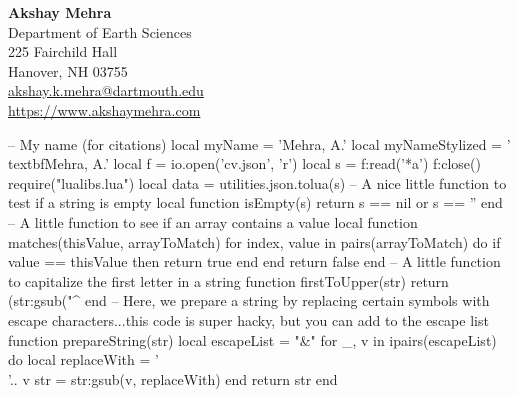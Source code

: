 \documentclass[letterpaper, 10pt]{article}
\begin{document}
\thispagestyle{empty}

\begin{center}
	{\Large \textbf{Akshay Mehra}}\\
	Department of Earth Sciences \\
	225 Fairchild Hall \\
	Hanover, NH 03755 \\
	\href{mailto:akshay.k.mehra@dartmouth.edu}{akshay.k.mehra@dartmouth.edu} \\
	\href{https://www.akshaymehra.com}{https://www.akshaymehra.com}\\
\end{center}
	

\begin{luacode}
	-- My name (for citations)
	local myName = 'Mehra, A.'
	local myNameStylized = '\\textbf{Mehra, A.}'
	local f = io.open('cv.json', 'r')
	local s = f:read('*a')
	f:close()
	require("lualibs.lua")
	local data = utilities.json.tolua(s)
	-- A nice little function to test if a string is empty
	local function isEmpty(s)
		return s == nil or s == ''
	end
	-- A little function to see if an array contains a value
	local function matches(thisValue, arrayToMatch)
		for index, value in pairs(arrayToMatch) do
			if value == thisValue then
				return true
			end
		end
		return false
	end
	-- A little function to capitalize the first letter in a string
	function firstToUpper(str)
		return (str:gsub("^%
	end
	-- Here, we prepare a string by replacing certain symbols with escape characters...this code is super hacky, but you can add to the escape list
	function prepareString(str)
		local escapeList = {"&"}
		for _, v in ipairs(escapeList) do
			local replaceWith = '\\'.. v 
			str = str:gsub(v, replaceWith)
		end
		return str
	end


\end{luacode}
\end{document}
